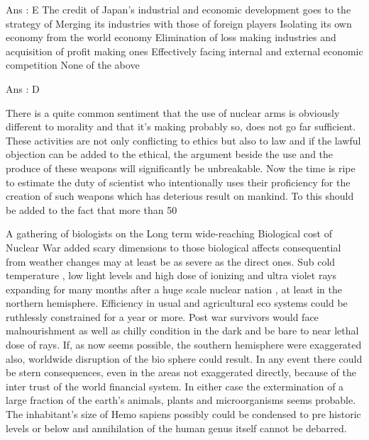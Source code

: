     Ans : E
    The credit of Japan’s industrial and economic development goes to the strategy of
        Merging its industries with those of foreign players
        Isolating its own economy from the world economy
        Elimination of loss making industries and acquisition of profit making ones
        Effectively facing internal and external economic competition
        None of the above 

    Ans : D 


There is a quite common sentiment that the use of nuclear arms is obviously different to morality and that it’s making probably so, does not go far sufficient. These activities are not only conflicting to ethics but also to law and if the lawful objection can be added to the ethical, the argument beside the use and the produce of these weapons will significantly be unbreakable. Now the time is ripe to estimate the duty of scientist who intentionally uses their proficiency for the creation of such weapons which has deterious result on mankind. To this should be added to the fact that more than 50%

A gathering of biologists on the Long term wide-reaching Biological cost of Nuclear War added scary dimensions to those biological affects consequential from weather changes may at least be as severe as the direct ones. Sub cold temperature , low light levels and high dose of ionizing and ultra violet rays expanding for many months after a huge scale nuclear nation , at least in the northern hemisphere. Efficiency in usual and agricultural eco systems could be ruthlessly constrained for a year or more. Post war survivors would face malnourishment as well as chilly condition in the dark and be bare to near lethal dose of rays. If, as now seems possible, the southern hemisphere were exaggerated also, worldwide disruption of the bio sphere could result. In any event there could be stern consequences, even in the areas not exaggerated directly, because of the inter trust of the world financial system. In either case the extermination of a large fraction of the earth’s animals, plants and microorganisms seems probable. The inhabitant’s size of Hemo sapiens possibly could be condensed to pre historic levels or below and annihilation of the human genus itself cannot be debarred.

